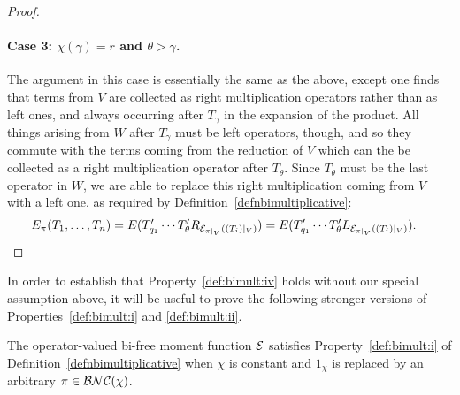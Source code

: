 \begin{proof}
			\paragraph{Case 3: $\chi(\gamma) = r$ and $\theta > \gamma$.}
			The argument in this case is essentially the same as the above, except one finds that terms from $V$ are collected as right multiplication operators rather than as left ones, and always occurring after $T_\gamma$ in the expansion of the product.
			All things arising from $W$ after $T_\gamma$ must be left operators, though, and so they commute with the terms coming from the reduction of $V$ which can the be collected as a right multiplication operator after $T_\theta$.
			Since $T_\theta$ must be the last operator in $W$, we are able to replace this right multiplication coming from $V$ with a left one, as required by Definition~\ref{defnbimultiplicative}:
			\begin{align*}	
				E_\pi(T_1, \ldots, T_n)
				= E(T_{q_1}' \cdots T_\theta' R_{\mathcal{E}_{\pi|_V}((T_i)|_V)})
				= E(T_{q_1}' \cdots T_\theta' L_{\mathcal{E}_{\pi|_V}((T_i)|_V)}).
				&\qedhere
			\end{align*}
		\end{proof}

		In order to establish that Property~\ref{def:bimult:iv} holds without our special assumption above, it will be useful to prove the following stronger versions of Properties~\ref{def:bimult:i} and \ref{def:bimult:ii}.

		\begin{lemma}
			\label{lemenhancedpropertyiforE}
			The operator-valued bi-free moment function $\mathcal{E}$ satisfies Property~\ref{def:bimult:i} of Definition~\ref{defnbimultiplicative} when $\chi$ is constant and $1_\chi$ is replaced by an arbitrary $\pi \in \mathcal{BNC}(\chi)$.
		\end{lemma}


